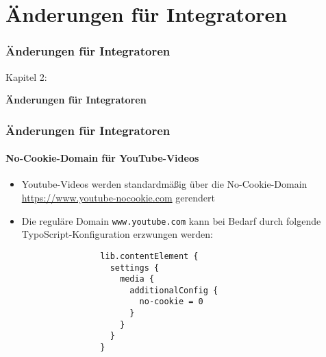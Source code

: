 %

\section{Änderungen für Integratoren}
\begin{frame}[fragile]
	\frametitle{Änderungen für Integratoren}

	\begin{center}\huge{Kapitel 2:}\end{center}
	\begin{center}\huge{\color{typo3darkgrey}\textbf{Änderungen für Integratoren}}\end{center}

\end{frame}


\begin{frame}[fragile]
	\frametitle{Änderungen für Integratoren}
	\framesubtitle{No-Cookie-Domain für YouTube-Videos}

	\lstset{basicstyle=\smaller\ttfamily}

	\begin{itemize}
		\item Youtube-Videos werden standardmäßig über die No-Cookie-Domain
			\url{https://www.youtube-nocookie.com} gerendert
		\item Die reguläre Domain \texttt{www.youtube.com} kann bei Bedarf durch folgende
			TypoScript-Konfiguration erzwungen werden:

			\begin{lstlisting}
				lib.contentElement {
				  settings {
				    media {
				      additionalConfig {
				        no-cookie = 0
				      }
				    }
				  }
				}
			\end{lstlisting}

	\end{itemize}

\end{frame}


